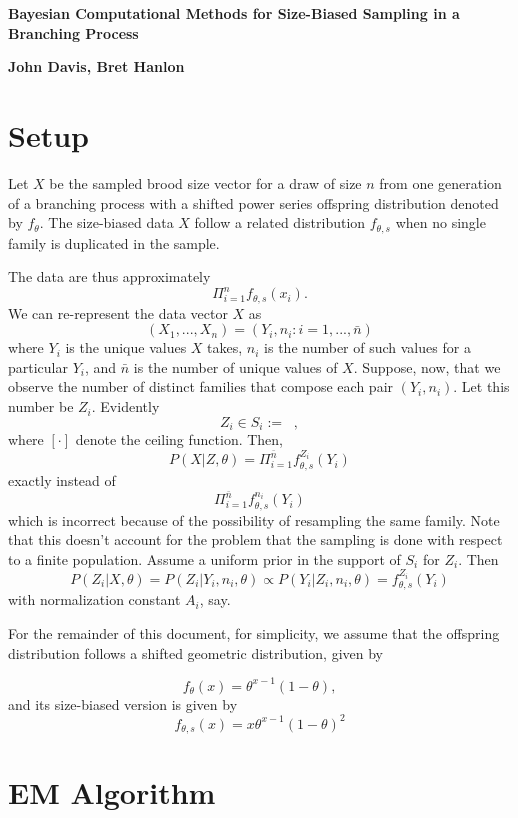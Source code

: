\documentclass[11 pt]{article}
\renewcommand{\th}{\theta}
\newcommand{\fbr}[1]{ \mathop{ \left\{ #1 \right\} } }
\newcommand{\Title}[1]{\begin{center}{\Large \bf #1} \end{center}}
\newcommand{\fth}{f_{\th}}
\newcommand{\fths}{f_{\th,s}}
\begin{document}
\Title{Bayesian Computational Methods for Size-Biased Sampling in a Branching Process}

\Title{John Davis, Bret Hanlon}

\section{Setup}
Let $X$ be the sampled brood size vector for a draw of size $n$ from one generation of a branching process with a shifted power series offspring distribution denoted by $\fth$. The size-biased data $X$ follow a related distribution $\fths$ when no single family is duplicated in the sample. 

The data are thus approximately 
\[
\Pi_{i=1}^n \fths(x_i).
\]
We can re-represent the data vector $X$ as 
\[
(X_1,...,X_n) = (Y_i,n_i : i=1,...,\bar{n})
\]
where $Y_i$ is the unique values $X$ takes, $n_i$ is the number of such values for a particular $Y_i$, and $\bar{n}$ is the number of unique values of $X$. Suppose, now, that we observe the number of distinct families that compose each pair $(Y_i,n_i)$. Let this number be $Z_i$. Evidently
\[
Z_i \in S_i:= \fbr{ [n_i / y_i],...,n_i},
\]
where $[\cdot]$ denote the ceiling function.  Then, 
\[
P(X|Z,\th) = \Pi_{i=1}^{\bar{n}} \fths^{Z_i}(Y_i)
\]
exactly instead of
\[
\Pi_{i=1}^{\bar{n}} \fths^{n_i}(Y_i)
\]
which is incorrect because of the possibility of resampling the same family. Note that this doesn't account for the problem that the sampling is done with respect to a finite population.  Assume a uniform prior in the support of $S_i$ for $Z_i$. Then
\[
P(Z_i|X,\th) = P(Z_i|Y_i,n_i,\th) \propto P(Y_i|Z_i,n_i,\th) = \fths^{Z_i}(Y_i)
\]
with normalization constant $A_i$, say.

For the remainder of this document, for simplicity, we assume that the offspring distribution follows a shifted geometric distribution, given by

\[
\fth(x) = \th^{x -1} (1 - \th),
\]
and its size-biased version is given by
\[
\fths(x) = x \th^{x - 1} (1 - \th)^2
\]

\section{EM Algorithm}
\end{document}
